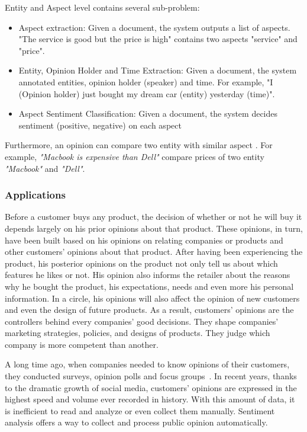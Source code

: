 Entity and Aspect level contains several sub-problem:
\begin{itemize}
    \item Aspect extraction: Given a document, the system outputs a list of aspects. "The service is good but the price is high" contains two aspects "service" and "price".
    \item Entity, Opinion Holder and Time Extraction: Given a document, the system annotated entities, opinion holder (speaker) and time. For example, "I (Opinion holder) just bought my dream car (entity) yesterday (time)".
    \item Aspect Sentiment Classification: Given a document, the system decides sentiment (positive, negative) on each aspect
\end{itemize}

 Furthermore, an opinion can compare two entity with similar aspect \cite{jindal2006mining}. For example, \textit{"Macbook is expensive than Dell"} compare prices of two entity \textit{"Macbook"} and \textit{"Dell"}.

\subsubsection{Applications}
Before a customer buys any product, the decision of whether or not he will buy it depends largely on his prior opinions about that product.
These opinions, in turn, have been built based on his opinions on relating companies or products and other customers' opinions about that product.
After having been experiencing the product, his posterior opinions on the product not only tell us about which features he likes or not.
His opinion also informs the retailer about the reasons why he bought the product, his expectations, needs and even more his personal information.
In a circle, his opinions will also affect the opinion of new customers and even the design of future products.
As a result, customers' opinions are the controllers behind every companies' good decisions.
They shape companies' marketing strategies, policies, and designs of products.
They judge which company is more competent than another.

A long time ago, when companies needed to know opinions of their customers, they conducted surveys, opinion polls and focus groups~\cite{liu2012sentiment}.
In recent years, thanks to the dramatic growth of social media, customers' opinions are expressed in the highest speed and volume ever recorded in history.
With this amount of data, it is inefficient to read and analyze or even collect them manually. Sentiment analysis offers a way to collect and process public opinion automatically.

